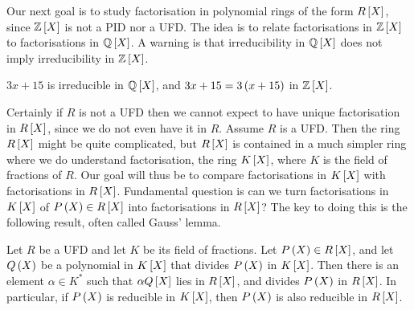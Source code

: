 Our next goal is to study factorisation in polynomial rings of the form $ R\sbr{X} $, since $ \ZZ\sbr{X} $ is not a PID nor a UFD. The idea is to relate factorisations in $ \ZZ\sbr{X} $ to factorisations in $ \QQ\sbr{X} $. A warning is that irreducibility in $ \QQ\sbr{X} $ does not imply irreducibility in $ \ZZ\sbr{X} $.

\begin{example*}
$ 3x + 15 $ is irreducible in $ \QQ\sbr{X} $, and $ 3x + 15 = 3\br{x + 15} $ in $ \ZZ\sbr{X} $.
\end{example*}

Certainly if $ R $ is not a UFD then we cannot expect to have unique factorisation in $ R\sbr{X} $, since we do not even have it in $ R $. Assume $ R $ is a UFD. Then the ring $ R\sbr{X} $ might be quite complicated, but $ R\sbr{X} $ is contained in a much simpler ring where we do understand factorisation, the ring $ K\sbr{X} $, where $ K $ is the field of fractions of $ R $. Our goal will thus be to compare factorisations in $ K\sbr{X} $ with factorisations in $ R\sbr{X} $. Fundamental question is can we turn factorisations in $ K\sbr{X} $ of $ P\br{X} \in R\sbr{X} $ into factorisations in $ R\sbr{X} $? The key to doing this is the following result, often called Gauss' lemma.

\begin{theorem}
\label{thm:9.2.1}
Let $ R $ be a UFD and let $ K $ be its field of fractions. Let $ P\br{X} \in R\sbr{X} $, and let $ Q\br{X} $ be a polynomial in $ K\sbr{X} $ that divides $ P\br{X} $ in $ K\sbr{X} $. Then there is an element $ \alpha \in K^* $ such that $ \alpha Q\sbr{X} $ lies in $ R\sbr{X} $, and divides $ P\br{X} $ in $ R\sbr{X} $. In particular, if $ P\br{X} $ is reducible in $ K\sbr{X} $, then $ P\br{X} $ is also reducible in $ R\sbr{X} $.
\end{theorem}

